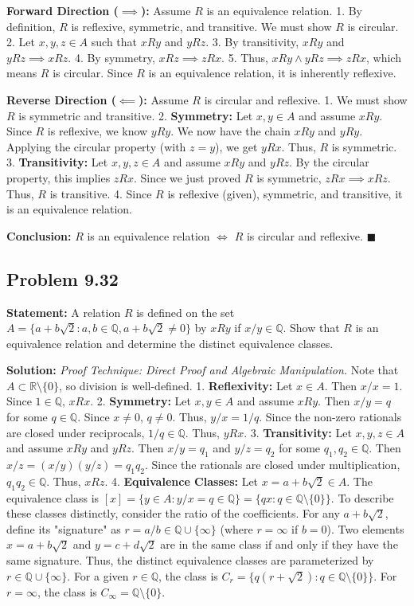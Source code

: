 \documentclass[11pt, a4paper]{article}
\theoremstyle{definition}
\theoremstyle{remark}
\newcommand{\R}{\mathbb{R}}
\newcommand{\Q}{\mathbb{Q}}
\begin{document}
\textbf{Forward Direction ($\implies$):} Assume $R$ is an equivalence relation.
1. By definition, $R$ is reflexive, symmetric, and transitive. We must show $R$ is circular.
2. Let $x, y, z \in A$ such that $x R y$ and $y R z$.
3. By transitivity, $x R y$ and $y R z \implies x R z$.
4. By symmetry, $x R z \implies z R x$.
5. Thus, $x R y \land y R z \implies z R x$, which means $R$ is circular. Since $R$ is an equivalence relation, it is inherently reflexive.

\textbf{Reverse Direction ($\impliedby$):} Assume $R$ is circular and reflexive.
1. We must show $R$ is symmetric and transitive.
2. \textbf{Symmetry:} Let $x, y \in A$ and assume $x R y$. Since $R$ is reflexive, we know $y R y$. We now have the chain $x R y$ and $y R y$. Applying the circular property (with $z = y$), we get $y R x$. Thus, $R$ is symmetric.
3. \textbf{Transitivity:} Let $x, y, z \in A$ and assume $x R y$ and $y R z$. By the circular property, this implies $z R x$. Since we just proved $R$ is symmetric, $z R x \implies x R z$. Thus, $R$ is transitive.
4. Since $R$ is reflexive (given), symmetric, and transitive, it is an equivalence relation.

\textbf{Conclusion:} $R$ is an equivalence relation $\iff$ $R$ is circular and reflexive. $\blacksquare$

\subsection{Problem 9.32}
\textbf{Statement:} A relation $R$ is defined on the set $A = \{a + b\sqrt{2} : a, b \in \Q, a + b\sqrt{2} \neq 0\}$ by $x R y$ if $x/y \in \Q$. Show that $R$ is an equivalence relation and determine the distinct equivalence classes.

\textbf{Solution:}
\textit{Proof Technique: Direct Proof and Algebraic Manipulation.}
Note that $A \subset \R \setminus \{0\}$, so division is well-defined.
1. \textbf{Reflexivity:} Let $x \in A$. Then $x/x = 1$. Since $1 \in \Q$, $x R x$.
2. \textbf{Symmetry:} Let $x, y \in A$ and assume $x R y$. Then $x/y = q$ for some $q \in \Q$. Since $x \neq 0$, $q \neq 0$. Thus, $y/x = 1/q$. Since the non-zero rationals are closed under reciprocals, $1/q \in \Q$. Thus, $y R x$.
3. \textbf{Transitivity:} Let $x, y, z \in A$ and assume $x R y$ and $y R z$. Then $x/y = q_1$ and $y/z = q_2$ for some $q_1, q_2 \in \Q$. Then $x/z = (x/y)(y/z) = q_1 q_2$. Since the rationals are closed under multiplication, $q_1 q_2 \in \Q$. Thus, $x R z$.
4. \textbf{Equivalence Classes:} Let $x = a + b\sqrt{2} \in A$. The equivalence class is $[x] = \{ y \in A : y/x = q \in \Q \} = \{ qx : q \in \Q \setminus \{0\} \}$. 
   To describe these classes distinctly, consider the ratio of the coefficients. For any $a+b\sqrt{2}$, define its "signature" as $r = a/b \in \Q \cup \{\infty\}$ (where $r=\infty$ if $b=0$). 
   Two elements $x = a+b\sqrt{2}$ and $y = c+d\sqrt{2}$ are in the same class if and only if they have the same signature. 
   Thus, the distinct equivalence classes are parameterized by $r \in \Q \cup \{\infty\}$. For a given $r \in \Q$, the class is $C_r = \{ q(r + \sqrt{2}) : q \in \Q \setminus \{0\} \}$. For $r = \infty$, the class is $C_\infty = \Q \setminus \{0\}$.
\end{document}
